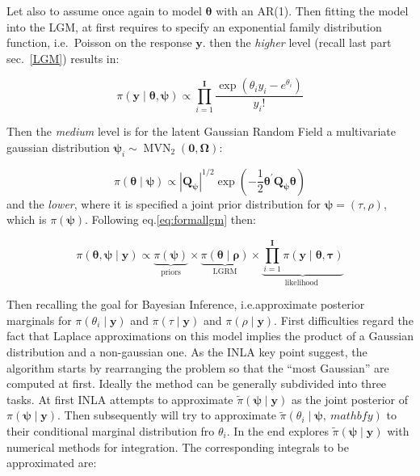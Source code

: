 \documentclass[
  12pt,
  a4paper,
  oneside]{book}
\theoremstyle{definition}
\theoremstyle{definition}
\theoremstyle{definition}
\theoremstyle{remark}
\begin{document}
Let also to assume once again to model \(\boldsymbol\theta\) with an AR(1).
Then fitting the model into the LGM, at first requires to specify an exponential family distribution function, i.e.~Poisson on the response \(\mathbf{y}\).
then the \emph{higher} level (recall last part sec.~\ref{LGM}) results in:

\[
\pi(\boldsymbol{\mathbf{y}} \mid \boldsymbol{\theta} , \boldsymbol{\psi}) \propto\prod_{i=1}^{\mathbf{I}} \frac{ \exp \left(\theta_{i} y_{i}-e^{\theta_{i}}\right) }{y_{i} !}
\]

Then the \emph{medium} level is for the latent Gaussian Random Field a multivariate gaussian distribution \(\boldsymbol{\psi}_{i} \sim \operatorname{MVN}_{2}(\mathbf{0}, \boldsymbol{\Omega})\):

\[
\pi(\boldsymbol{\theta} \mid \boldsymbol{\psi}) \propto\left|\boldsymbol{Q}_{\boldsymbol{\psi}}\right|^{1 / 2} \exp \left(-\frac{1}{2} \boldsymbol{\theta}^{\prime} \boldsymbol{Q}_{\boldsymbol{\psi}} \boldsymbol{\theta}\right)
\]
and the \emph{lower}, where it is specified a joint prior distribution for \(\boldsymbol\psi = (\tau, \rho)\), which is \(\pi(\boldsymbol\psi)\). Following eq.\eqref{eq:formallgm} then:

\begin{equation}
\pi(\boldsymbol{\theta}, \boldsymbol{\psi} \mid \mathbf{y})\propto  \underbrace{\pi(\boldsymbol{\psi})}_{\text {priors}} \times \underbrace{\pi(\boldsymbol\theta \mid \boldsymbol\rho)}_{\text {LGRM}} \times \underbrace{\prod_{i=1}^{\mathbf{I}} \pi\left(\mathbf{y} \mid \boldsymbol\theta, \boldsymbol{\tau}\right)}_{\text {likelihood }}
\label{eq:poissonlgm}
\end{equation}

Then recalling the goal for Bayesian Inference, i.e.approximate posterior marginals for \(\pi\left(\theta_{i} \mid \mathbf{y}\right)\) and \(\pi\left(\tau \mid \boldsymbol{\mathbf{y}}\right)\) and \(\pi\left(\rho \mid \boldsymbol{\mathbf{y}}\right)\). First difficulties regard the fact that Laplace approximations on this model implies the product of a Gaussian distribution and a non-gaussian one. As the INLA key point suggest, the algorithm starts by rearranging the problem so that the ``most Gaussian'' are computed at first.
Ideally the method can be generally subdivided into three tasks. At first INLA attempts to approximate \(\tilde{\pi}(\boldsymbol{\psi} \mid \boldsymbol{\mathbf{y}})\) as the joint posterior of \({\pi}(\boldsymbol{\psi} \mid \boldsymbol{\mathbf{y}})\). Then subsequently will try to approximate \(\tilde{\pi}\left(\theta_{i} \mid \boldsymbol\psi, \  mathbf{y}\right)\) to their conditional marginal distribution fro \(\theta_i\). In the end explores \(\tilde{\pi}(\boldsymbol{\psi} \mid \boldsymbol{\mathbf{y}})\) with numerical methods for integration.
The corresponding integrals to be approximated are:
\end{document}
